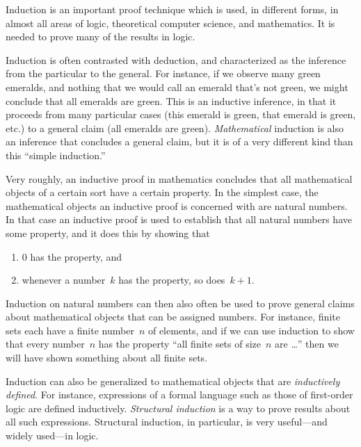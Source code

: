 \documentclass[../../../include/open-logic-section]{subfiles}
\begin{document}

Induction is an important proof technique which is used, in different
forms, in almost all areas of logic, theoretical computer science, and
mathematics.  It is needed to prove many of the results in logic.

Induction is often contrasted with deduction, and characterized as the
inference from the particular to the general.  For instance, if we
observe many green emeralds, and nothing that we would call an emerald
that's not green, we might conclude that all emeralds are green. This
is an inductive inference, in that it proceeds from many particular
cases (this emerald is green, that emerald is green, etc.) to a
general claim (all emeralds are green).  \emph{Mathematical} induction
is also an inference that concludes a general claim, but it is of a
very different kind than this ``simple induction.''

Very roughly, an inductive proof in mathematics concludes that all
mathematical objects of a certain sort have a certain property.  In
the simplest case, the mathematical objects an inductive proof is
concerned with are natural numbers.  In that case an inductive proof
is used to establish that all natural numbers have some property, and
it does this by showing that
\begin{enumerate}
    \item $0$ has the property, and
    \item whenever a number~$k$ has the property, so does~$k+1$.
\end{enumerate}
Induction on natural numbers can then also often be used to prove
general claims about mathematical objects that can be assigned numbers. For
instance, finite sets each have a finite number~$n$ of elements, and
if we can use induction to show that every number~$n$ has the property
``all finite sets of size~$n$ are \dots'' then we will have shown
something about all finite sets.

Induction can also be generalized to mathematical objects that are
\emph{inductively defined}.  For instance, expressions of a formal
language such as those of first-order logic are defined inductively.
\emph{Structural induction} is a way to prove results about all such
expressions.  Structural induction, in particular, is very
useful---and widely used---in logic.
\end{document}

